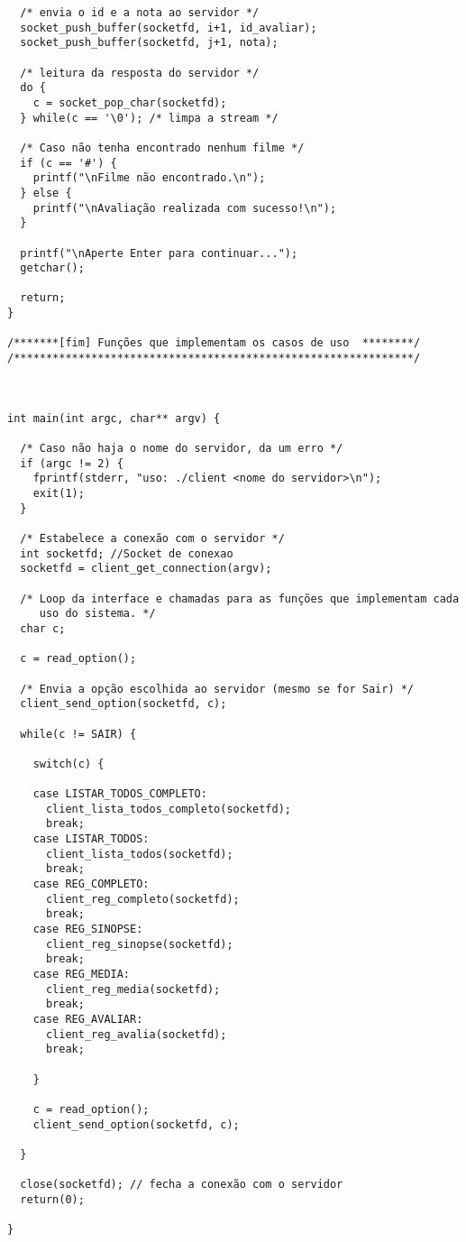 \documentclass[11pt,twoside]{article}
\begin{document}
\begin{verbatim}
  /* envia o id e a nota ao servidor */
  socket_push_buffer(socketfd, i+1, id_avaliar);
  socket_push_buffer(socketfd, j+1, nota);

  /* leitura da resposta do servidor */
  do {
    c = socket_pop_char(socketfd);
  } while(c == '\0'); /* limpa a stream */
  
  /* Caso não tenha encontrado nenhum filme */
  if (c == '#') {
    printf("\nFilme não encontrado.\n");
  } else {
    printf("\nAvaliação realizada com sucesso!\n");
  }

  printf("\nAperte Enter para continuar...");
  getchar();

  return;
}

/*******[fim] Funções que implementam os casos de uso  ********/
/**************************************************************/



int main(int argc, char** argv) {

  /* Caso não haja o nome do servidor, da um erro */
  if (argc != 2) {
    fprintf(stderr, "uso: ./client <nome do servidor>\n");
    exit(1);
  }
	
  /* Estabelece a conexão com o servidor */
  int socketfd; //Socket de conexao
  socketfd = client_get_connection(argv);

  /* Loop da interface e chamadas para as funções que implementam cada 
     uso do sistema. */
  char c;
		
  c = read_option();
    
  /* Envia a opção escolhida ao servidor (mesmo se for Sair) */
  client_send_option(socketfd, c);

  while(c != SAIR) {
      
    switch(c) {
	
    case LISTAR_TODOS_COMPLETO:
      client_lista_todos_completo(socketfd);
      break;
    case LISTAR_TODOS:
      client_lista_todos(socketfd);
      break;
    case REG_COMPLETO:
      client_reg_completo(socketfd);
      break;
    case REG_SINOPSE:
      client_reg_sinopse(socketfd);
      break;
    case REG_MEDIA:
      client_reg_media(socketfd);
      break;
    case REG_AVALIAR:
      client_reg_avalia(socketfd);
      break;
			
    }
    
    c = read_option();
    client_send_option(socketfd, c);

  }
	
  close(socketfd); // fecha a conexão com o servidor
  return(0);

}
\end{verbatim}
\end{document}
